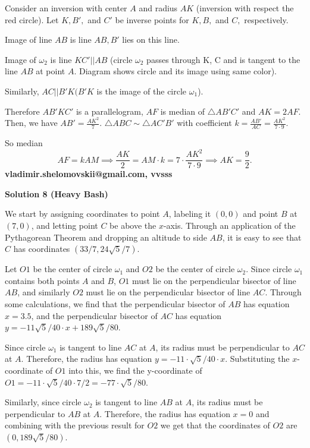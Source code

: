 \begin{enumerate}
 Consider an inversion with center $A$ and radius $AK$ (inversion with respect the red circle). Let $K, B',$ and $C'$ be inverse points for $K, B,$ and $C,$ respectively.

 Image of line $AB$ is line $AB, B'$ lies on this line. 

 Image of $\omega_2$ is line $KC'||AB$ (circle $\omega_2$ passes through K, C and is tangent to the line $AB$ at point $A.$ Diagram shows circle and its image using same color).

 Similarly, $AC||B'K (B'K$ is the image of the circle $\omega_1$).

 Therefore $AB'KC'$ is a parallelogram, $AF$ is median of $\triangle AB'C'$ and $AK = 2 AF.$Then, we have $AB'=\frac{AK^2}{7}$.  $\triangle ABC \sim \triangle AC'B'$ with coefficient $k =\frac {AB'}{AC} = \frac{AK^2}{7\cdot 9}.$

 So median 
 \[AF = k AM \implies \frac {AK}{2} = AM \cdot k = 7\cdot  \frac{AK^2}{7\cdot 9} \implies  AK = \frac{9}{2}.\]\textbf{vladimir.shelomovskii@gmail.com, vvsss}

 



\textbf{Solution 8 (Heavy Bash)}

We start by assigning coordinates to point $A$, labeling it $(0,0)$ and point $B$ at $(7,0)$, and letting point $C$ be above the $x$-axis. Through an application of the Pythagorean Theorem and dropping an altitude to side $AB$, it is easy to see that $C$ has coordinates $(33/7, 24\sqrt{5}/7)$.

 Let $O1$ be the center of circle $\omega_1$  and $O2$ be the center of circle $\omega_2$. Since circle $\omega_1$ contains both points $A$ and $B$, $O1$ must lie on the perpendicular bisector of line $AB$, and similarly $O2$ must lie on the perpendicular bisector of line $AC$. Through some calculations, we find that the perpendicular bisector of $AB$ has equation $x = 3.5$, and the perpendicular bisector of $AC$ has equation $y = {-11\sqrt{5}/40 \cdot x} + 189\sqrt{5}/80$. 

 Since circle $\omega_1$ is tangent to line $AC$ at $A$, its radius must be perpendicular to $AC$ at $A$. Therefore, the radius has equation $y = {{-11\cdot\sqrt{5}/40} \cdot x}$. Substituting the $x$-coordinate of $O1$ into this, we find the y-coordinate of $O1 = {{-11 \cdot \sqrt{5}/40} \cdot 7/2} = {-77 \cdot \sqrt{5}/80}$. 

 Similarly, since circle $\omega_2$ is tangent to line $AB$ at $A$, its radius must be perpendicular to $AB$ at $A$. Therefore, the radius has equation $x = 0$ and combining with the previous result for $O2$ we get that the coordinates of $O2$ are $(0, 189\sqrt{5}/80)$. 


\end{enumerate}
